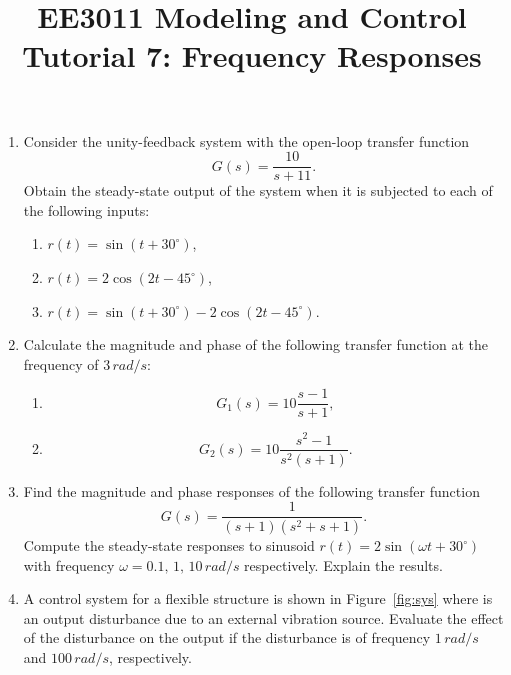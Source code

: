 \documentclass{article}
\title{EE3011 Modeling and Control\\Tutorial 7: Frequency Responses}
\date{}
\begin{document}
 \maketitle

\begin{enumerate}
\item Consider the unity-feedback system with the open-loop transfer function  
  \[
    G(s) = \frac{10}{s+11}.
  \]
  Obtain the steady-state output of the system when it is subjected to each of the following inputs:
  \begin{enumerate}
  \item  $r(t) = \sin(t+30^\circ)$,
  \item  $r(t) = 2\cos(2t-45^\circ)$,
  \item  $r(t) = \sin(t+30^\circ)-2\cos(2t-45^\circ)$.
  \end{enumerate}

\item Calculate the magnitude and phase of the following transfer function at the frequency of $3\,rad/s$:
  \begin{enumerate}
  \item \[G_1(s) = 10\frac{s-1}{s+1},\]
  \item  \[G_2(s) = 10\frac{s^2-1}{s^2(s+1)}.\]
  \end{enumerate}

\item Find the magnitude and phase responses of the following transfer function
  \[
    G(s) = \frac{1}{(s+1)(s^2+s+1)}.
  \]
  Compute the steady-state responses to sinusoid $r(t) = 2\sin(\omega t+30^\circ)$ with frequency $\omega = 0.1,\,1,\,10\,rad/s$ respectively. Explain the results.

\item A control system for a flexible structure is shown in Figure~\ref{fig:sys} where is an output disturbance due to an external vibration source. Evaluate the effect of the disturbance on the output if the disturbance is of frequency $1\,rad/s$ and $100\,rad/s$, respectively.
  \begin{figure}[ht]
    \centering
{}
\end{figure}
\end{enumerate}
\end{document}
